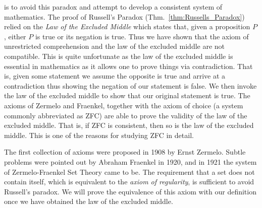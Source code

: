      is to avoid this paradox and attempt to
    develop a consistent system of mathematics. The proof of Russell's Paradox
    (Thm.~\ref{thm:Russells_Paradox}) relied on the
    \textit{Law of the Excluded Middle} which
    states that, given a proposition $P$, either $P$ is true or its negation is
    true. Thus we have shown that the axiom of unrestricted
    comprehension and the law of the
    excluded middle are not compatible. This is quite unfortunate as the law of
    the excluded middle is essential in mathematics as it allows one to prove
    things via contradiction. That is, given some
    statement we assume the opposite is true and arrive at a contradiction thus
    showing the negation of our statement is false. We then invoke the law of
    the excluded middle to show that our original statement is true. The axioms
    of Zermelo and Fraenkel, together with the axiom of choice (a system
    commonly abbreviated as \gls{ZFC}) are able to prove the validity of the law
    of the excluded middle. That is, if ZFC is consistent, then so is the law of
    the excluded middle. This is one of the reasons for studying ZFC in detail.
    \par\hfill\par
    The first collection of axioms were proposed in 1908 by
    Ernst Zermelo. Subtle problems were pointed out by
    Abraham Fraenkel in 1920, and in 1921 the system of
    Zermelo-Fraenkel Set Theory came to be.
    The requirement that a set does not contain itself, which is equivalent to
    the \textit{axiom of regularity}, is sufficient
    to avoid Russell's paradox. We will prove the equivalence of this axiom with
    our definition once we have obtained the law of the excluded middle.
